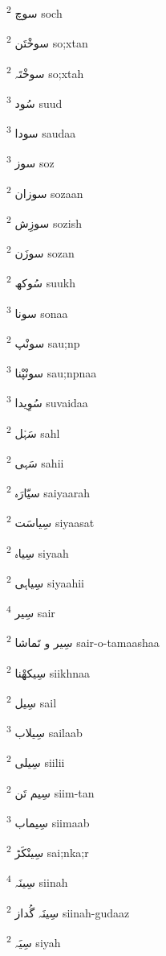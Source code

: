 \documentclass[12pt]{article}
\begin{document}
\begin{multicols}{5}
{\ur سوچ}   \textsuperscript{2} soch

{\ur سوخْتَن}   \textsuperscript{2} so;xtan

{\ur سوخْتَہ}   \textsuperscript{2} so;xtah

{\ur سُود}   \textsuperscript{3} suud

{\ur سودا}   \textsuperscript{3} saudaa

{\ur سوز}   \textsuperscript{3} soz

{\ur سوزان}   \textsuperscript{2} sozaan

{\ur سوزِش}   \textsuperscript{2} sozish

{\ur سوزَن}   \textsuperscript{2} sozan

{\ur سُوکھ}   \textsuperscript{2} suukh

{\ur سونا}   \textsuperscript{3} sonaa

{\ur سونْپ}   \textsuperscript{2} sau;np

{\ur سونْپْنا}   \textsuperscript{3} sau;npnaa

{\ur سُوِیدا}   \textsuperscript{3} suvaidaa

{\ur سَہْل}   \textsuperscript{2} sahl

{\ur سَہی}   \textsuperscript{2} sahii

{\ur سیّارَہ}   \textsuperscript{2} saiyaarah

{\ur سِیاسَت}   \textsuperscript{2} siyaasat

{\ur سِیاہ}   \textsuperscript{2} siyaah

{\ur سِیاہی}   \textsuperscript{2} siyaahii

{\ur سِیر}   \textsuperscript{4} sair

{\ur سِیر و تَماشا}   \textsuperscript{2} sair-o-tamaashaa

{\ur سِیکھْنا}   \textsuperscript{2} siikhnaa

{\ur سِیل}   \textsuperscript{2} sail

{\ur سِیلاب}   \textsuperscript{3} sailaab

{\ur سِیلی}   \textsuperscript{2} siilii

{\ur سِیم تَن}   \textsuperscript{2} siim-tan

{\ur سِیماب}   \textsuperscript{3} siimaab

{\ur سِینْکَڑ}   \textsuperscript{2} sai;nka;r

{\ur سِینَہ}   \textsuperscript{4} siinah

{\ur سِینَہ گُداز}   \textsuperscript{2} siinah-gudaaz

{\ur سِیَہ}   \textsuperscript{2} siyah


\end{multicols}
\end{document}
